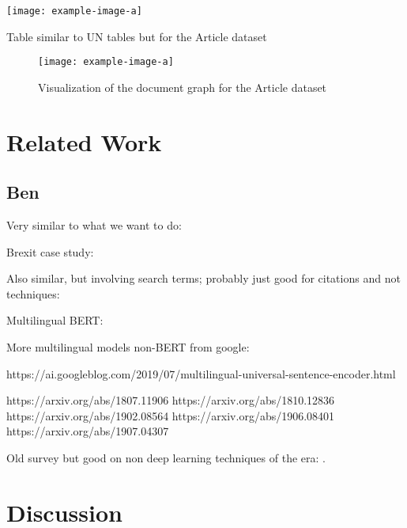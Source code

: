 \documentclass[11pt]{article}
\begin{document}
\begin{table}
    \centering
    \texttt{[image: example-image-a]}
    \caption{Table similar to UN tables but for the Article dataset}
\end{table}

\begin{figure}
    \centering
    \texttt{[image: example-image-a]}
    \caption{Visualization of the document graph for the Article dataset}
\end{figure}

\section{Related Work}
\label{sec:related}

\subsection{Ben}

Very similar to what we want to do: \cite{rupnik2016news,miranda2018multilingual,wang2018estimation,germann2019scalable,seki2018exploring,seki2020cross,linger2020batch}

Brexit case study: \cite{peterlin2019detecting}

Also similar, but involving search terms; probably just good for citations and not techniques: \cite{rupnik2016news}

Multilingual BERT:

\cite{K2020Cross-Lingual}

\cite{pires2019multilingual}

More multilingual models non-BERT from google:

https://ai.googleblog.com/2019/07/multilingual-universal-sentence-encoder.html

https://arxiv.org/abs/1807.11906
https://arxiv.org/abs/1810.12836
https://arxiv.org/abs/1902.08564
https://arxiv.org/abs/1906.08401
https://arxiv.org/abs/1907.04307

Old survey but good on non deep learning techniques of the era: \cite{oard1998survey}.

\section{Discussion}
\label{sec:discussion}




\end{document}
